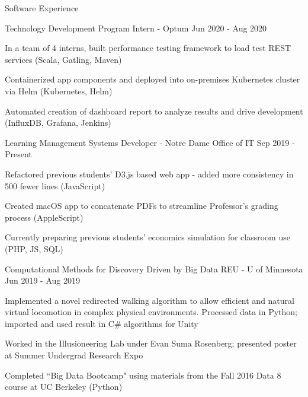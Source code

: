 \documentclass[10pt]{resume} %
\begin{document}
\begin{rSection}{ Software Experience }

\begin{rSubsection}{ Technology Development Program Intern - Optum }{ Jun 2020 - Aug 2020 }{}{}
\item In a team of 4 interns, built performance testing framework to load test REST services (Scala, Gatling, Maven)
\item Containerized app components and deployed into on-premises Kubernetes cluster via Helm (Kubernetes, Helm)
\item Automated creation of dashboard report to analyze results and drive development (InfluxDB, Grafana, Jenkins)
\end{rSubsection}

\begin{rSubsection}{ Learning Management Systems Developer - Notre Dame Office of IT }{ Sep 2019 - Present }{}{}
\item Refactored previous students' D3.js based web app - added more consistency in 500 fewer lines (JavaScript)
\item Created macOS app to concatenate PDFs to streamline Professor's grading process (AppleScript)
\item Currently preparing previous students' economics simulation for classroom use (PHP, JS, SQL)
\end{rSubsection}

\begin{rSubsection}{ Computational Methods for Discovery Driven by Big Data REU - U of Minnesota}{ Jun 2019 - Aug 2019 }{}{}
\item Implemented a novel redirected walking algorithm to allow efficient and natural virtual locomotion in complex physical environments. Processed data in Python; imported and used result in C\# algorithms for Unity
\item Worked in the Illusioneering Lab under Evan Suma Rosenberg; presented poster at Summer Undergrad Research Expo%
\item Completed ``Big Data Bootcamp" using materials from the Fall 2016 Data 8 course at UC Berkeley (Python)
\end{rSubsection}


\end{rSection}
\end{document}
